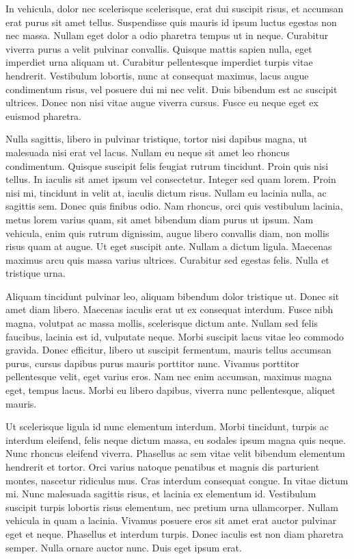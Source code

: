 In vehicula, dolor nec scelerisque scelerisque, erat dui suscipit risus, et accumsan erat purus sit amet tellus. Suspendisse quis mauris id ipsum luctus egestas non nec massa. Nullam eget dolor a odio pharetra tempus ut in neque. Curabitur viverra purus a velit pulvinar convallis. Quisque mattis sapien nulla, eget imperdiet urna aliquam ut. Curabitur pellentesque imperdiet turpis vitae hendrerit. Vestibulum lobortis, nunc at consequat maximus, lacus augue condimentum risus, vel posuere dui mi nec velit. Duis bibendum est ac suscipit ultrices. Donec non nisi vitae augue viverra cursus. Fusce eu neque eget ex euismod pharetra.

Nulla sagittis, libero in pulvinar tristique, tortor nisi dapibus magna, ut malesuada nisi erat vel lacus. Nullam eu neque sit amet leo rhoncus condimentum. Quisque suscipit felis feugiat rutrum tincidunt. Proin quis nisi tellus. In iaculis sit amet ipsum vel consectetur. Integer sed quam lorem. Proin nisi mi, tincidunt in velit at, iaculis dictum risus. Nullam eu lacinia nulla, ac sagittis sem. Donec quis finibus odio. Nam rhoncus, orci quis vestibulum lacinia, metus lorem varius quam, sit amet bibendum diam purus ut ipsum. Nam vehicula, enim quis rutrum dignissim, augue libero convallis diam, non mollis risus quam at augue. Ut eget suscipit ante. Nullam a dictum ligula. Maecenas maximus arcu quis massa varius ultrices. Curabitur sed egestas felis. Nulla et tristique urna.

Aliquam tincidunt pulvinar leo, aliquam bibendum dolor tristique ut. Donec sit amet diam libero. Maecenas iaculis erat ut ex consequat interdum. Fusce nibh magna, volutpat ac massa mollis, scelerisque dictum ante. Nullam sed felis faucibus, lacinia est id, vulputate neque. Morbi suscipit lacus vitae leo commodo gravida. Donec efficitur, libero ut suscipit fermentum, mauris tellus accumsan purus, cursus dapibus purus mauris porttitor nunc. Vivamus porttitor pellentesque velit, eget varius eros. Nam nec enim accumsan, maximus magna eget, tempus lacus. Morbi eu libero dapibus, viverra nunc pellentesque, aliquet mauris.

Ut scelerisque ligula id nunc elementum interdum. Morbi tincidunt, turpis ac interdum eleifend, felis neque dictum massa, eu sodales ipsum magna quis neque. Nunc rhoncus eleifend viverra. Phasellus ac sem vitae velit bibendum elementum hendrerit et tortor. Orci varius natoque penatibus et magnis dis parturient montes, nascetur ridiculus mus. Cras interdum consequat congue. In vitae dictum mi. Nunc malesuada sagittis risus, et lacinia ex elementum id. Vestibulum suscipit turpis lobortis risus elementum, nec pretium urna ullamcorper. Nullam vehicula in quam a lacinia. Vivamus posuere eros sit amet erat auctor pulvinar eget et neque. Phasellus et interdum turpis. Donec iaculis est non diam pharetra semper. Nulla ornare auctor nunc. Duis eget ipsum erat.

